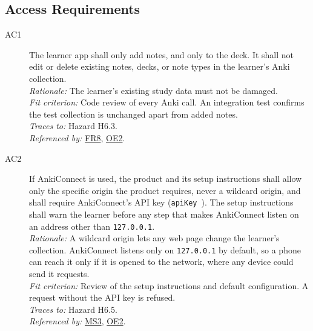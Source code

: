\documentclass[12pt]{article}
\newcommand{\rat}[1]{\\\textit{Rationale:} #1}
\newcommand{\fit}[1]{\\\textit{Fit criterion:} #1}
\newcommand{\trace}[1]{\\\textit{Traces to:} #1}
\newcommand{\usedby}[1]{\\\textit{Referenced by:} #1}
\newcommand{\reqdef}[1]{\hypertarget{req:#1}{#1}}
\newcommand{\req}[1]{\hyperlink{req:#1}{#1}}
\begin{document}
\subsection{Access Requirements}
\begin{description}
\item[\reqdef{AC1}] The learner app shall only add notes, and only to the \progname{}
deck. It shall not edit or delete existing notes, decks, or note types in the
learner's Anki collection.
\rat{The learner's existing study data must not be damaged.}
\fit{Code review of every Anki call. An integration test confirms the test
collection is unchanged apart from added notes.}
\trace{Hazard H6.3.}
\usedby{\req{FR8}, \req{OE2}.}

\item[\reqdef{AC2}] If AnkiConnect is used, the product and its setup instructions shall
allow only the specific origin the product requires, never a wildcard origin,
and shall require AnkiConnect's API key (\texttt{apiKey}~\cite{AnkiConnect}).
The setup instructions shall warn the learner before any step that makes
AnkiConnect listen on an address other than \texttt{127.0.0.1}.
\rat{A wildcard origin lets any web page change the learner's collection.
AnkiConnect listens only on \texttt{127.0.0.1} by default, so a phone can
reach it only if it is opened to the network, where any device could send it
requests.}
\fit{Review of the setup instructions and default configuration. A request
without the API key is refused.}
\trace{Hazard H6.5.}
\usedby{\req{MS3}, \req{OE2}.}
\end{description}
\end{document}
